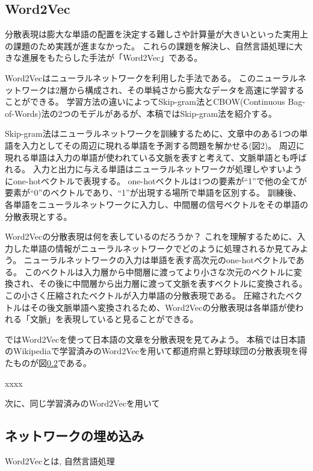 \documentclass[J]{scitrans}
\begin{document}
\subsection{Word2Vec}

分散表現は膨大な単語の配置を決定する難しさや計算量が大きいといった実用上の課題のため実践が進まなかった。
これらの課題を解決し、自然言語処理に大きな進展をもたらした手法が「Word2Vec」である。

Word2Vecはニューラルネットワークを利用した手法である。
このニューラルネットワークは2層から構成され、その単純さから膨大なデータを高速に学習することができる。
学習方法の違いによってSkip-gram法とCBOW(Continuous Bag-of-Words)法の2つのモデルがあるが、本稿ではSkip-gram法を紹介する。

Skip-gram法はニューラルネットワークを訓練するために、文章中のある1つの単語を入力としてその周辺に現れる単語を予測する問題を解かせる(図2)。
周辺に現れる単語は入力の単語が使われている文脈を表すと考えて、文脈単語とも呼ばれる。
入力と出力に与える単語はニューラルネットワークが処理しやすいようにone-hotベクトルで表現する。
one-hotベクトルは1つの要素が``1''で他の全てが要素が``0''のベクトルであり、``1''が出現する場所で単語を区別する。
訓練後、各単語をニューラルネットワークに入力し、中間層の信号ベクトルをその単語の分散表現とする。

Word2Vecの分散表現は何を表しているのだろうか？
これを理解するために、入力した単語の情報がニューラルネットワークでどのように処理されるか見てみよう。
ニューラルネットワークの入力は単語を表す高次元のone-hotベクトルである。
このベクトルは入力層から中間層に渡ってより小さな次元のベクトルに変換され、その後に中間層から出力層に渡って文脈を表すベクトルに変換される。
この小さく圧縮されたベクトルが入力単語の分散表現である。
圧縮されたベクトルはその後文脈単語へ変換されるため、Word2Vecの分散表現は各単語が使われる「文脈」を表現していると見ることができる。

ではWord2Vecを使って日本語の文章を分散表現を見てみよう。
本稿では日本語のWikipediaで学習済みのWord2Vec\cite{park2016}を用いて都道府県と野球球団の分散表現を得たものが図\ref{}である。

xxxx

次に、同じ学習済みのWord2Vecを用いて

\subsection{ネットワークの埋め込み}


Word2Vecとは, 自然言語処理
\end{document}
